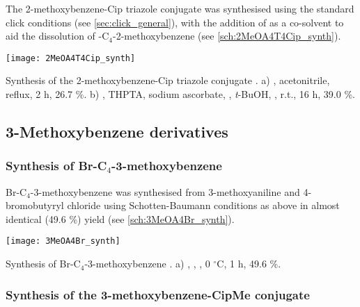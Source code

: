 The 2-methoxybenzene-Cip triazole conjugate  was synthesised using the standard click conditions  (see \ref{sec:click_general}), with the addition of  as a co-solvent to aid the dissolution of -C$_4$-2-methoxybenzene  (see \ref{sch:2MeOA4T4Cip_synth}).

\begin{scheme}[H]
	\begin{center}
				\texttt{[image: 2MeOA4T4Cip\_synth]}
		\caption{Synthesis of the 2-methoxybenzene-Cip triazole conjugate . 
		a) , acetonitrile, reflux, 2 h, 26.7 \%. 
		b) , THPTA, sodium ascorbate, , \textit{t}-BuOH, , r.t., 16 h, 39.0 \%.\label{sch:2MeOA4T4Cip_synth}}
	\end{center}
\end{scheme}

\subsection{3-Methoxybenzene derivatives}

\subsubsection{Synthesis of Br-C$_4$-3-methoxybenzene }

Br-C$_4$-3-methoxybenzene  was synthesised from 3-methoxyaniline  and 4-bromobutyryl chloride  using Schotten-Baumann conditions as above in almost identical (49.6 \%) yield (see \ref{sch:3MeOA4Br_synth}). 

\begin{scheme}[H]
	\begin{center}
		\texttt{[image: 3MeOA4Br\_synth]}
		\caption{Synthesis of Br-C$_4$-3-methoxybenzene .
			a) , , , 0 $^{\circ}$C, 1 h, 49.6 \%. \label{sch:3MeOA4Br_synth}}
	\end{center}
\end{scheme}

\subsubsection{Synthesis of the 3-methoxybenzene-CipMe conjugate }

